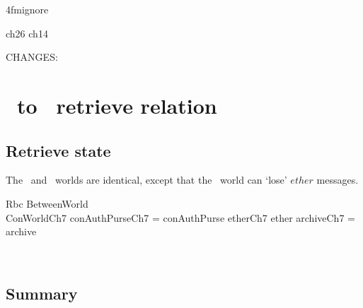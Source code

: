 \ai4fmignore{
\begin{zsection}
  \SECTION ch26 \parents ch14
\end{zsection}
CHANGES:
}
\chapter[$Rbc$]{\Betw\ to \Conc\ retrieve relation}
\label{ch26}

\section{Retrieve state}

The \Betw\ and \Conc\ worlds are identical, except that the \Conc\
world can `lose' $ether$ messages.
%
\begin{LSDef}
\begin{schema}{Rbc}
  BetweenWorld
  \\ %
  ConWorldCh7
  \where %
  conAuthPurseCh7 = conAuthPurse
  \also %
  etherCh7 \subseteq ether
  \also %
  archiveCh7 = archive
\end{schema}~\end{LSDef}

\newpage

\section{Summary}\label{ch26.summary}

\ldefsummary %
\lthmsummary %
\lthmaddeddefsummary %
\lthmaddedthmsummary %
\lzevessummary %

